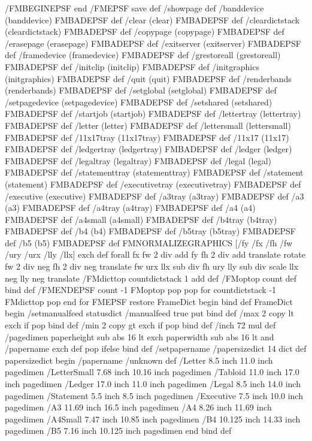 /FMBEGINEPSF { 
	end 
	/FMEPSF save def 
	/showpage {} def 
	/banddevice {(banddevice) FMBADEPSF} def
	/clear {(clear) FMBADEPSF} def
	/cleardictstack {(cleardictstack) FMBADEPSF} def 
	/copypage {(copypage) FMBADEPSF} def
	/erasepage {(erasepage) FMBADEPSF} def
	/exitserver {(exitserver) FMBADEPSF} def
	/framedevice {(framedevice) FMBADEPSF} def
	/grestoreall {(grestoreall) FMBADEPSF} def
	/initclip {(initclip) FMBADEPSF} def
	/initgraphics {(initgraphics) FMBADEPSF} def
	/quit {(quit) FMBADEPSF} def
	/renderbands {(renderbands) FMBADEPSF} def
	/setglobal {(setglobal) FMBADEPSF} def
	/setpagedevice {(setpagedevice) FMBADEPSF} def
	/setshared {(setshared) FMBADEPSF} def
	/startjob {(startjob) FMBADEPSF} def
	/lettertray {(lettertray) FMBADEPSF} def
	/letter {(letter) FMBADEPSF} def
	/lettersmall {(lettersmall) FMBADEPSF} def
	/11x17tray {(11x17tray) FMBADEPSF} def
	/11x17 {(11x17) FMBADEPSF} def
	/ledgertray {(ledgertray) FMBADEPSF} def
	/ledger {(ledger) FMBADEPSF} def
	/legaltray {(legaltray) FMBADEPSF} def
	/legal {(legal) FMBADEPSF} def
	/statementtray {(statementtray) FMBADEPSF} def
	/statement {(statement) FMBADEPSF} def
	/executivetray {(executivetray) FMBADEPSF} def
	/executive {(executive) FMBADEPSF} def
	/a3tray {(a3tray) FMBADEPSF} def
	/a3 {(a3) FMBADEPSF} def
	/a4tray {(a4tray) FMBADEPSF} def
	/a4 {(a4) FMBADEPSF} def
	/a4small {(a4small) FMBADEPSF} def
	/b4tray {(b4tray) FMBADEPSF} def
	/b4 {(b4) FMBADEPSF} def
	/b5tray {(b5tray) FMBADEPSF} def
	/b5 {(b5) FMBADEPSF} def
	FMNORMALIZEGRAPHICS 
	[/fy /fx /fh /fw /ury /urx /lly /llx] {exch def} forall 
	fx fw 2 div add fy fh 2 div add  translate
	rotate
	fw 2 div neg fh 2 div neg translate
	fw urx llx sub div fh ury lly sub div scale 
	llx neg lly neg translate 
	/FMdicttop countdictstack 1 add def 
	/FMoptop count def 
	} bind def
/FMENDEPSF {
	count -1 FMoptop {pop pop} for 
	countdictstack -1 FMdicttop {pop end} for 
	FMEPSF restore
	FrameDict begin 
	} bind def
FrameDict begin 
/setmanualfeed {
	 statusdict /manualfeed true put
	} bind def
/max {2 copy lt {exch} if pop} bind def
/min {2 copy gt {exch} if pop} bind def
/inch {72 mul} def
/pagedimen { 
	paperheight sub abs 16 lt exch 
	paperwidth sub abs 16 lt and
	{/papername exch def} {pop} ifelse
	} bind def
/setpapername { 
	/papersizedict 14 dict def 
	papersizedict begin
	/papername /unknown def 
		/Letter 8.5 inch 11.0 inch pagedimen
		/LetterSmall 7.68 inch 10.16 inch pagedimen
		/Tabloid 11.0 inch 17.0 inch pagedimen
		/Ledger 17.0 inch 11.0 inch pagedimen
		/Legal 8.5 inch 14.0 inch pagedimen
		/Statement 5.5 inch 8.5 inch pagedimen
		/Executive 7.5 inch 10.0 inch pagedimen
		/A3 11.69 inch 16.5 inch pagedimen
		/A4 8.26 inch 11.69 inch pagedimen
		/A4Small 7.47 inch 10.85 inch pagedimen
		/B4 10.125 inch 14.33 inch pagedimen
		/B5 7.16 inch 10.125 inch pagedimen
	end
	} bind def
